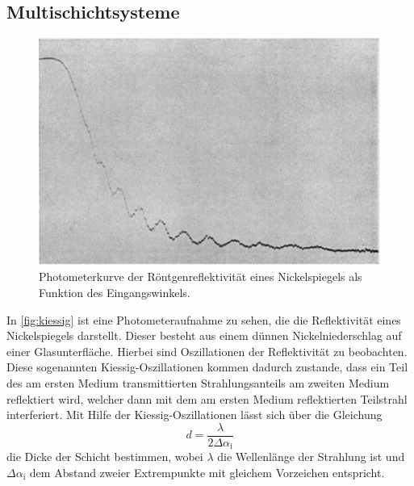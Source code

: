 \subsection{Multischichtsysteme}
\begin{figure}[tb]
  \centering
  \includegraphics[width=12cm,keepaspectratio]{kiessing_oszillationen.png}
  \caption{Photometerkurve der Röntgenreflektivität eines Nickelspiegels als Funktion des Eingangswinkels.\cite{kiessig}}
  \label{fig:kiessig}
\end{figure}
In \autoref{fig:kiessig} ist eine Photometeraufnahme zu sehen, die die Reflektivität eines Nickelspiegels darstellt. Dieser besteht aus einem dünnen Nickelniederschlag auf einer Glasunterfläche. Hierbei sind Oszillationen der Reflektivität zu beobachten. Diese sogenannten Kiessig-Oszillationen kommen dadurch zustande, dass ein Teil des am ersten Medium transmittierten Strahlungsanteils am zweiten Medium reflektiert wird, welcher dann mit dem am ersten Medium reflektierten Teilstrahl interferiert. Mit Hilfe der Kiessig-Oszillationen lässt sich über die Gleichung
\begin{equation}
  d = \frac{\lambda}{2 \Delta \alpha_\mathrm{i}}
  \label{eqn:abstandoderso}
\end{equation}
die Dicke der Schicht bestimmen, wobei $\lambda$ die Wellenlänge der Strahlung ist und $\Delta \alpha_\mathrm{i}$ dem Abstand zweier Extrempunkte mit gleichem Vorzeichen entspricht.

